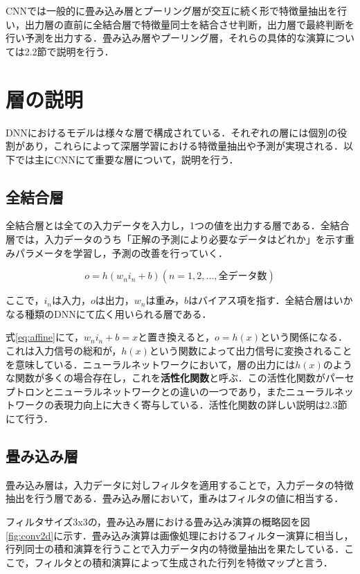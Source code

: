 \documentclass[a4j, 11pt]{jreport}
\begin{document}
CNNでは一般的に畳み込み層とプーリング層が交互に続く形で特徴量抽出を行い，出力層の直前に全結合層で特徴量同士を結合させ判断，出力層で最終判断を行い予測を出力する．畳み込み層やプーリング層，それらの具体的な演算については2.2節で説明を行う．


\newpage
\section{層の説明}
DNNにおけるモデルは様々な層で構成されている．それぞれの層には個別の役割があり，これらによって深層学習における特徴量抽出や予測が実現される．以下では主にCNNにて重要な層について，説明を行う．
\subsection{全結合層}
全結合層とは全ての入力データを入力し，1つの値を出力する層である．全結合層では，入力データのうち「正解の予測により必要なデータはどれか」を示す重みパラメータを学習し，予測の改善を行っていく．

\begin{equation}
 o = h(w_n i_n + b)　(n = 1, 2, ... , 全データ数)
 \label{eq:affine}
\end{equation}

ここで，$i_n$は入力，$o$は出力，$w_n$は重み，$b$はバイアス項を指す．全結合層はいかなる種類のDNNにて広く用いられる層である．

式\ref{eq:affine}にて，$w_n i_n + b = x$と置き換えると，$o = h(x)$という関係になる．これは入力信号の総和が，$h(x)$という関数によって出力信号に変換されることを意味している．ニューラルネットワークにおいて，層の出力には$h(x)$のような関数が多くの場合存在し，これを\textbf{活性化関数}と呼ぶ．この活性化関数がパーセプトロンとニューラルネットワークとの違いの一つであり，またニューラルネットワークの表現力向上に大きく寄与している．活性化関数の詳しい説明は2.3節にて行う．
\subsection{畳み込み層}
畳み込み層は，入力データに対しフィルタを適用することで，入力データの特徴抽出を行う層である．畳み込み層において，重みはフィルタの値に相当する．

フィルタサイズ3x3の，畳み込み層における畳み込み演算の概略図を図\ref{fig:conv2d}に示す．畳み込み演算は画像処理におけるフィルター演算に相当し，行列同士の積和演算を行うことで入力データ内の特徴量抽出を果たしている．ここで，フィルタとの積和演算によって生成された行列を特徴マップと言う．
\end{document}

